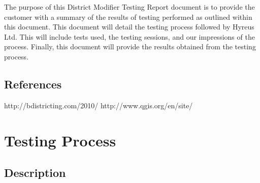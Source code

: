 \documentclass{article}
\begin{document}
\vspace{2.5mm}

\begin{addmargin}[4em]{0em}

The purpose of this District Modifier Testing Report document is to provide the customer with a summary of the results of testing performed as outlined within this document.  This document will detail the testing process followed by Hyreus Ltd. This will include tests used, the testing sessions, and our impressions of the process.  Finally, this document will provide the results obtained from the testing process.

\end{addmargin}

\vspace{2.5mm}


\subsection{References}

\vspace{2.5mm}

\begin{addmargin}[4em]{0em}

http://bdistricting.com/2010/\newline
http://www.qgis.org/en/site/

\end{addmargin}

\vspace{2.5mm}


\section{Testing Process}\label{sec:testingProcess}

\subsection{Description}

\vspace{2.5mm}
\end{document}
